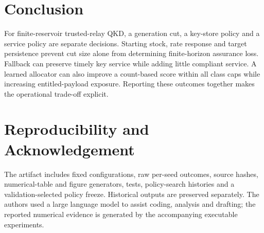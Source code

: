 \documentclass[conference,a4paper]{IEEEtran}
\begin{document}
\section{Conclusion}
For finite-reservoir trusted-relay QKD, a generation cut, a key-store policy and a service policy are separate decisions. Starting stock, rate response and target persistence prevent cut size alone from determining finite-horizon assurance loss. Fallback can preserve timely key service while adding little compliant service. A learned allocator can also improve a count-based score within all class caps while increasing entitled-payload exposure. Reporting these outcomes together makes the operational trade-off explicit.

\section*{Reproducibility and Acknowledgement}
The artifact includes fixed configurations, raw per-seed outcomes, source hashes, numerical-table and figure generators, tests, policy-search histories and a validation-selected policy freeze. Historical outputs are preserved separately. The authors used a large language model to assist coding, analysis and drafting; the reported numerical evidence is generated by the accompanying executable experiments.
\end{document}
